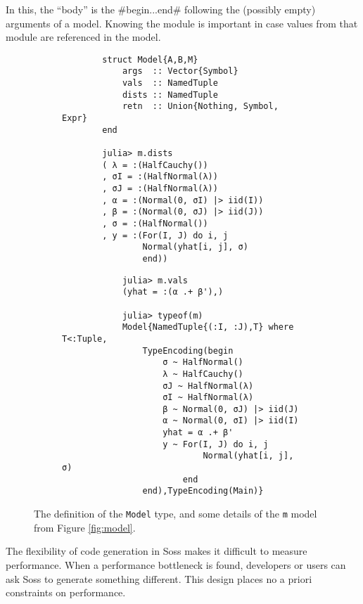 \documentclass[anonymous=false, %
               format=acmsmall, %
               review=false, %
               screen=true, %
               nonacm=true]{acmart}
\begin{document}
In this, the ``body'' is the \jl#begin...end# following the (possibly empty) arguments of a model. Knowing the module is important in case values from that module are referenced in the model.


\begin{figure}[t]
    \begin{subfigure}[b]{0.48\textwidth}
        \begin{verbatim}
        struct Model{A,B,M} 
            args  :: Vector{Symbol}
            vals  :: NamedTuple
            dists :: NamedTuple
            retn  :: Union{Nothing, Symbol, Expr}
        end

        julia> m.dists
        ( λ = :(HalfCauchy())
        , σI = :(HalfNormal(λ))
        , σJ = :(HalfNormal(λ))
        , α = :(Normal(0, σI) |> iid(I))
        , β = :(Normal(0, σJ) |> iid(J))
        , σ = :(HalfNormal())
        , y = :(For(I, J) do i, j
                Normal(yhat[i, j], σ)
                end))
        \end{verbatim}

    \end{subfigure}    
    \begin{subfigure}[b]{0.48\textwidth}
        \begin{verbatim}
            julia> m.vals
            (yhat = :(α .+ β'),)

            julia> typeof(m)
            Model{NamedTuple{(:I, :J),T} where T<:Tuple,
                TypeEncoding(begin
                    σ ~ HalfNormal()
                    λ ~ HalfCauchy()
                    σJ ~ HalfNormal(λ)
                    σI ~ HalfNormal(λ)
                    β ~ Normal(0, σJ) |> iid(J)
                    α ~ Normal(0, σI) |> iid(I)
                    yhat = α .+ β'
                    y ~ For(I, J) do i, j
                            Normal(yhat[i, j], σ)
                        end
                end),TypeEncoding(Main)}
        \end{verbatim}
    \end{subfigure}    
    \caption{The definition of the \texttt{Model} type, and some details of the \texttt{m} model from Figure \ref{fig:model}.}
\end{figure}

The flexibility of code generation in Soss makes it difficult to measure performance. When a performance bottleneck is found, developers or users can ask Soss to generate something different. This design places no a priori constraints on performance.
\end{document}
